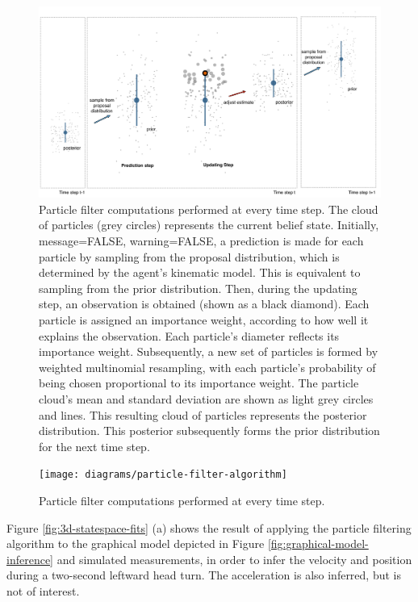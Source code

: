 \documentclass[english,floatsintext,man]{apa6}
\theoremstyle{definition}
\theoremstyle{definition}
\theoremstyle{remark}
\begin{document}
\begin{figure}
\centering
\includegraphics{diagrams/figure-particle-filter-explained.pdf}
\caption{\label{fig:particle-filter-explained}Particle filter computations
performed at every time step. The cloud of particles (grey circles)
represents the current belief state. Initially, message=FALSE,
warning=FALSE, a prediction is made for each particle by sampling from
the proposal distribution, which is determined by the agent's kinematic
model. This is equivalent to sampling from the prior distribution. Then,
during the updating step, an observation is obtained (shown as a black
diamond). Each particle is assigned an importance weight, according to
how well it explains the observation. Each particle's diameter reflects
its importance weight. Subsequently, a new set of particles is formed by
weighted multinomial resampling, with each particle's probability of
being chosen proportional to its importance weight. The particle cloud's
mean and standard deviation are shown as light grey circles and lines.
This resulting cloud of particles represents the posterior distribution.
This posterior subsequently forms the prior distribution for the next
time step.}
\end{figure}

\begin{figure}
\texttt{[image: diagrams/particle-filter-algorithm]} \caption{Particle filter computations performed at every time step.}\label{fig:particle-filter-algorithm}
\end{figure}

Figure \ref{fig:3d-statespace-fits} (a) shows the result of applying the
particle filtering algorithm to the graphical model depicted in Figure
\ref{fig:graphical-model-inference} and simulated measurements, in order
to infer the velocity and position during a two-second leftward head
turn. The acceleration is also inferred, but is not of interest.
\end{document}
